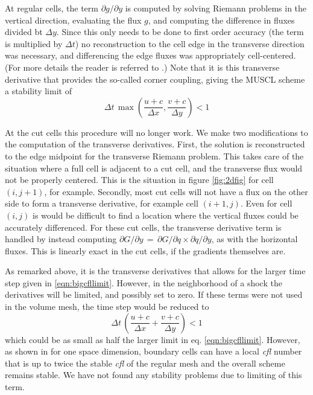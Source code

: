 At regular cells, the term $\partial g / \partial y$ is computed by solving Riemann
problems in the vertical direction,  evaluating the flux $g$, and computing the
difference in fluxes divided bt $\Delta y$.
Since this only needs to be done to first order accuracy (the term is multiplied
by $\Delta t$)  no reconstruction to the cell edge  in the transverse 
direction was necessary,
and differencing the edge fluxes was appropriately cell-centered.
(For more details the reader is referred to \cite{Colella:Unsplit}.)
Note that it is this transverse derivative that provides the so-called corner coupling,
giving the MUSCL scheme a stability limit of
\begin{equation}
\label{eqn:bigcfllimit}
\Delta t \, \max \left (\frac{u+c}{\Delta x} , \frac{v+c}{\Delta y} \right) < 1
\end{equation}

At the cut cells this procedure will no longer work.   We make two modifications to the
computation of the transverse derivatives. First,
the solution is reconstructed to the edge midpoint  for the transverse Riemann problem.
This takes care of the situation where a full cell is adjacent to a cut cell, and
the transverse flux would not be properly centered. This is the situation
in figure \ref{fig:2dfig} for cell $(i,j+1)$, for example.
Secondly, most cut cells will not have a flux on the other side to form a
transverse derivative, for example cell $(i+1,j)$. Even for cell $(i,j)$ is would
be difficult to find a location where the vertical fluxes could be accurately differenced.
For these cut cells, the transverse derivative term is handled by instead computing
$ \partial G / \partial y \, = \,  \partial G / \partial q \times \partial q / \partial y$,
as with the horizontal fluxes. This is linearly exact in the cut cells, 
if the gradients themselves are.

As remarked above, it is the transverse derivatives that allows for the larger time
step given in \eqref{eqn:bigcfllimit}.
However, in the neighborhood of a shock the derivatives will be limited, and
possibly set to zero.
If these terms were not used  in the volume mesh, the time step would be reduced to 
\begin{equation}
\Delta t \, \left (\frac{u+c}{\Delta x} + \frac{v+c}{\Delta y} \right) < 1
\end{equation}
which could be as small as half the larger limit in eq. \eqref{eqn:bigcfllimit}.
However, as shown in \cite{mjb:stability2} for one space dimension, 
boundary cells can have
a local {\em cfl} number that is up to twice the stable {\em cfl} of the regular
mesh and the overall scheme remains stable.  We have not found any stability
problems due to limiting of this term.  

